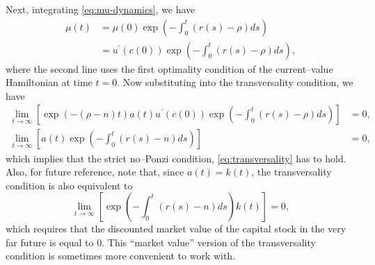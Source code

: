\documentclass[\topdir/lecture\_notes.tex]{subfiles}
\begin{document}
Next, integrating \eqref{eq:mu-dynamics}, we have
\[
  \begin{aligned}
    \mu(t) & =\mu(0) \exp \left(-\int_{0}^{t}(r(s)-\rho) ds\right)           \\
           & =u^{\prime}(c(0)) \exp \left(-\int_{0}^{t}(r(s)-\rho) ds\right),
  \end{aligned}
\]
where the second line uses the first optimality condition of the current--value Hamiltonian at time \(t=0\).
Now substituting into the transversality condition, we have
\[
  \begin{aligned}
    \lim _{t \rightarrow \infty}\left[\exp(-(\rho-n) t) a(t) u^{\prime}(c(0)) \exp \left(-\int_{0}^{t}(r(s)-\rho) ds\right)\right] & =0, \\
    \lim _{t \rightarrow \infty}\left[a(t) \exp \left(-\int_{0}^{t}(r(s)-n) ds\right)\right]                                       & =0,
  \end{aligned}
\]
which implies that the strict no--Ponzi condition, \eqref{eq:transversality} has to hold.
Also, for future reference, note that, since \(a(t)=k(t)\), the transversality condition is also equivalent to
\[
  \lim _{t \rightarrow \infty}\left[\exp \left(-\int_{0}^{t}(r(s)-n) ds\right) k(t)\right]=0,
\]
which requires that the discounted market value of the capital stock in the very far future is equal to 0.
This ``market value'' version of the transversality condition is sometimes more convenient to work with.
\end{document}
